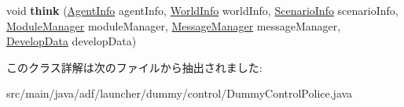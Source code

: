 \begin{DoxyCompactItemize}
\hypertarget{classadf_1_1launcher_1_1dummy_1_1control_1_1DummyControlPolice_a6d8466a2f5428d45fc68ac3399fd5857}{}\label{classadf_1_1launcher_1_1dummy_1_1control_1_1DummyControlPolice_a6d8466a2f5428d45fc68ac3399fd5857} 
void {\bfseries think} (\hyperlink{classadf_1_1agent_1_1info_1_1AgentInfo}{Agent\+Info} agent\+Info, \hyperlink{classadf_1_1agent_1_1info_1_1WorldInfo}{World\+Info} world\+Info, \hyperlink{classadf_1_1agent_1_1info_1_1ScenarioInfo}{Scenario\+Info} scenario\+Info, \hyperlink{classadf_1_1agent_1_1module_1_1ModuleManager}{Module\+Manager} module\+Manager, \hyperlink{classadf_1_1agent_1_1communication_1_1MessageManager}{Message\+Manager} message\+Manager, \hyperlink{classadf_1_1agent_1_1develop_1_1DevelopData}{Develop\+Data} develop\+Data)
\end{DoxyCompactItemize}


このクラス詳解は次のファイルから抽出されました\+:\begin{DoxyCompactItemize}
\item 
src/main/java/adf/launcher/dummy/control/Dummy\+Control\+Police.\+java\end{DoxyCompactItemize}
